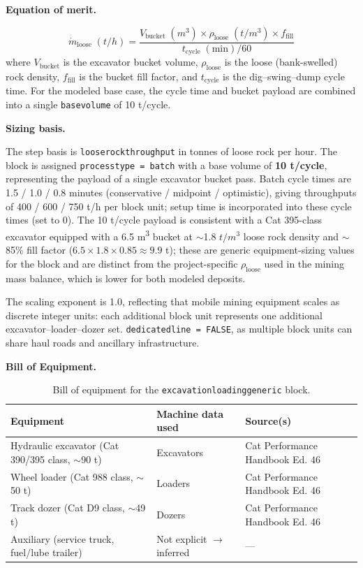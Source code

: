 \documentclass{article}
\renewcommand\_{\textunderscore\allowbreak}
\begin{document}
\medskip
\noindent\textbf{Equation of merit.}\quad

\[
	\dot{m}_{\text{loose}}\;(\si{t/h}) = \frac{V_{\text{bucket}}\;(\si{m^3}) \times \rho_{\text{loose}}\;(\si{t/m^3}) \times f_{\text{fill}}}{t_{\text{cycle}}\;(\text{min}) / 60}
\]
where $V_{\text{bucket}}$ is the excavator bucket volume, $\rho_{\text{loose}}$ is the loose (bank-swelled) rock density, $f_{\text{fill}}$ is the bucket fill factor, and $t_{\text{cycle}}$ is the dig--swing--dump cycle time. For the modeled base case, the cycle time and bucket payload are combined into a single \texttt{base\_volume} of 10 t/cycle.

\medskip
\noindent\textbf{Sizing basis.}\quad

The step basis is \texttt{loose\_rock\_throughput} in tonnes of loose rock per hour. The block is assigned \texttt{process\_type = batch} with a base volume of \textbf{10 t/cycle}, representing the payload of a single excavator bucket pass. Batch cycle times are 1.5 / 1.0 / 0.8 minutes (conservative / midpoint / optimistic), giving throughputs of 400 / 600 / 750 t/h per block unit; setup time is incorporated into these cycle times (set to 0). The 10 t/cycle payload is consistent with a Cat 395-class excavator equipped with a 6.5 \si{m^3} bucket at $\sim$1.8 $\si{t/m^3}$ loose rock density and $\sim$85\% fill factor ($6.5 \times 1.8 \times 0.85 \approx 9.9$ t); these are generic equipment-sizing values for the block and are distinct from the project-specific $\rho_{\text{loose}}$ used in the mining mass balance, which is lower for both modeled deposits. 

The scaling exponent is 1.0, reflecting that mobile mining equipment scales as discrete integer units: each additional block unit represents one additional excavator--loader--dozer set. \texttt{dedicated\_line = FALSE}, as multiple block units can share haul roads and ancillary infrastructure.

\medskip
\noindent\textbf{Bill of Equipment.}\quad

\begin{table}[h!]
\caption{Bill of equipment for the \texttt{excavation\_loading\_generic} block.}
\centering
\begin{tabular}{>{\raggedright\arraybackslash}p{5.2cm}
				>{\raggedright\arraybackslash}p{4cm}
				>{\raggedright\arraybackslash}p{4.5cm}}
\toprule
\textbf{Equipment} & \textbf{Machine data used} & \textbf{Source(s)} \\
\midrule
Hydraulic excavator (Cat 390/395 class, $\sim$90 t) & Excavators & Cat Performance Handbook Ed. 46 \\
Wheel loader (Cat 988 class, $\sim$50 t) & Loaders & Cat Performance Handbook Ed. 46 \\
Track dozer (Cat D9 class, $\sim$49 t) & Dozers & Cat Performance Handbook Ed. 46 \\
Auxiliary (service truck, fuel/lube trailer) & Not explicit $\rightarrow$ inferred & --- \\
\bottomrule
\end{tabular}
\end{table}
\end{document}
